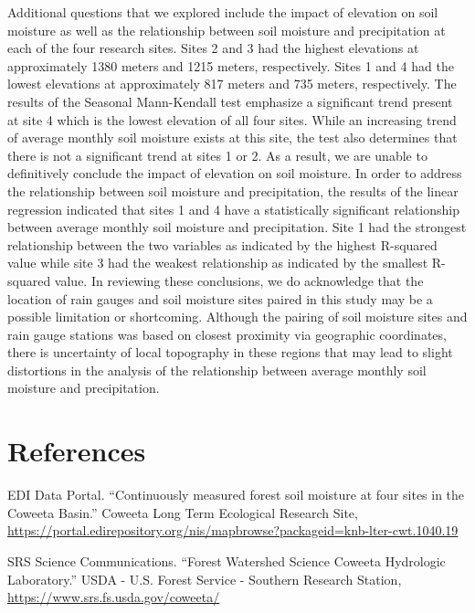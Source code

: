 \documentclass[
  12pt,
]{article}
\begin{document}
Additional questions that we explored include the impact of elevation on
soil moisture as well as the relationship between soil moisture and
precipitation at each of the four research sites. Sites 2 and 3 had the
highest elevations at approximately 1380 meters and 1215 meters,
respectively. Sites 1 and 4 had the lowest elevations at approximately
817 meters and 735 meters, respectively. The results of the Seasonal
Mann-Kendall test emphasize a significant trend present at site 4 which
is the lowest elevation of all four sites. While an increasing trend of
average monthly soil moisture exists at this site, the test also
determines that there is not a significant trend at sites 1 or 2. As a
result, we are unable to definitively conclude the impact of elevation
on soil moisture. In order to address the relationship between soil
moisture and precipitation, the results of the linear regression
indicated that sites 1 and 4 have a statistically significant
relationship between average monthly soil moisture and precipitation.
Site 1 had the strongest relationship between the two variables as
indicated by the highest R-squared value while site 3 had the weakest
relationship as indicated by the smallest R-squared value. In reviewing
these conclusions, we do acknowledge that the location of rain gauges
and soil moisture sites paired in this study may be a possible
limitation or shortcoming. Although the pairing of soil moisture sites
and rain gauge stations was based on closest proximity via geographic
coordinates, there is uncertainty of local topography in these regions
that may lead to slight distortions in the analysis of the relationship
between average monthly soil moisture and precipitation.

\newpage

\hypertarget{references}{%
\section{References}\label{references}}

EDI Data Portal. ``Continuously measured forest soil moisture at four
sites in the Coweeta Basin.'' Coweeta Long Term Ecological Research
Site,
\url{https://portal.edirepository.org/nis/mapbrowse?packageid=knb-lter-cwt.1040.19}

SRS Science Communications. ``Forest Watershed Science Coweeta
Hydrologic Laboratory.'' USDA - U.S. Forest Service - Southern Research
Station, \url{https://www.srs.fs.usda.gov/coweeta/}
\end{document}
